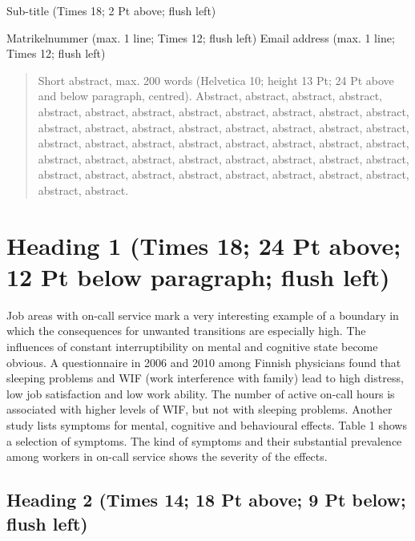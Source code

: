 \documentclass{CML_Seminar_Template}
\begin{document}
{Sub-title (Times 18; 2 Pt above; flush left)}

\author{First\_name Last\_name (Times 14; 12 Pt above; flush left)}
       {Matrikelnummer (max. 1 line; Times 12; flush left)}
       {Email address (max. 1 line; Times 12; flush left)}

\begin{abstract}
Short abstract, max. 200 words  (Helvetica 10; height 13 Pt; 24 Pt above and below paragraph, centred). Abstract, abstract, abstract, abstract, abstract, abstract, abstract, abstract, abstract, abstract, abstract, abstract, abstract, abstract, abstract, abstract, abstract, abstract, abstract, abstract, abstract, abstract, abstract, abstract, abstract, abstract, abstract, abstract, abstract, abstract, abstract, abstract, abstract, abstract, abstract, abstract, abstract, abstract, abstract, abstract, abstract, abstract, abstract, abstract, abstract, abstract. 
\end{abstract}

\vspace{24pt}

\section{Heading 1 (Times 18; 24 Pt above; 12 Pt below paragraph; flush left)}

Job areas with on-call service mark a very interesting example of a boundary in which the consequences for unwanted transitions are especially high. The influences of constant interruptibility on mental and cognitive state become obvious. A questionnaire in 2006 and 2010 among Finnish physicians found that sleeping problems and WIF (work interference with family) lead to high distress, low job satisfaction and low work ability. The number of active on-call hours is associated with higher levels of WIF, but not with sleeping problems.
Another study lists symptoms for mental, cognitive and behavioural effects. Table 1 shows a selection of symptoms. The kind of symptoms and their substantial prevalence among workers in on-call service shows the severity of the effects.

\subsection{Heading 2 (Times 14; 18 Pt above; 9 Pt below; flush left)}
\end{document}
